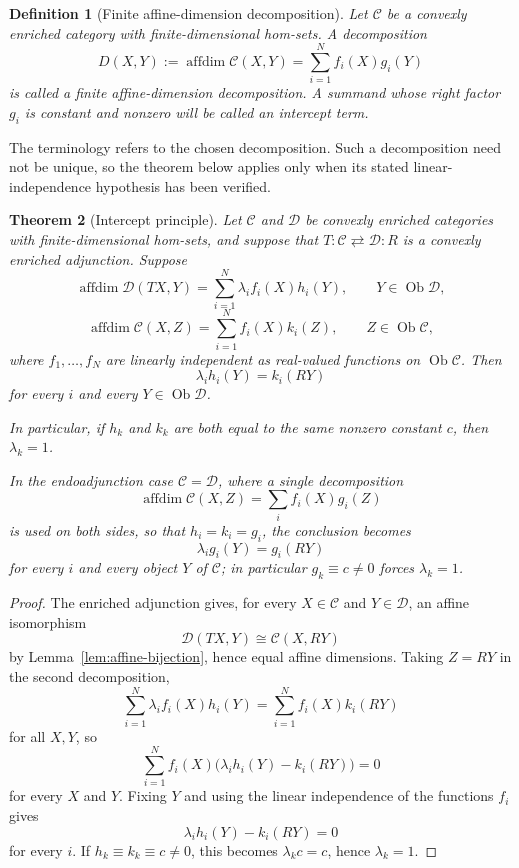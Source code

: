 \documentclass[11pt]{article}
\newtheorem{theorem}{Theorem}[section]
\newtheorem{definition}[theorem]{Definition}
\DeclareMathOperator{\affdim}{affdim}
\DeclareMathOperator{\Ob}{Ob}
\begin{document}
\begin{definition}[Finite affine-dimension decomposition]
Let $\mathcal C$ be a convexly enriched category with finite-dimensional
hom-sets. A decomposition
\[
D(X,Y):=\affdim\mathcal C(X,Y)
=
\sum_{i=1}^N f_i(X)g_i(Y)
\]
is called a \emph{finite affine-dimension decomposition}. A summand whose
right factor $g_i$ is constant and nonzero will be called an intercept term.
\end{definition}

The terminology refers to the chosen decomposition. Such a decomposition need
not be unique, so the theorem below applies only when its stated
linear-independence hypothesis has been verified.

\begin{theorem}[Intercept principle]
\label{thm:intercept}
Let $\mathcal C$ and $\mathcal D$ be convexly enriched categories with
finite-dimensional hom-sets, and suppose that
$T:\mathcal C\rightleftarrows\mathcal D:R$ is a convexly enriched
adjunction. Suppose
\[
\affdim\mathcal D(TX,Y)
=
\sum_{i=1}^N \lambda_i f_i(X)h_i(Y),
\qquad
Y\in\Ob\mathcal D,
\]
\[
\affdim\mathcal C(X,Z)
=
\sum_{i=1}^N f_i(X)k_i(Z),
\qquad
Z\in\Ob\mathcal C,
\]
where $f_1,\dots,f_N$ are linearly independent as real-valued functions on
$\Ob\mathcal C$. Then
\[
\lambda_i h_i(Y)=k_i(RY)
\]
for every $i$ and every $Y\in\Ob\mathcal D$.

In particular, if $h_k$ and $k_k$ are both equal to the same nonzero
constant $c$, then $\lambda_k=1$.

In the endoadjunction case $\mathcal C=\mathcal D$, where a single
decomposition
\[
\affdim\mathcal C(X,Z)=\sum_i f_i(X)g_i(Z)
\]
is used on both sides, so that $h_i=k_i=g_i$, the conclusion becomes
\[
\lambda_i g_i(Y)=g_i(RY)
\]
for every $i$ and every object $Y$ of $\mathcal C$; in particular
$g_k\equiv c\neq0$ forces $\lambda_k=1$.
\end{theorem}

\begin{proof}
The enriched adjunction gives, for every $X\in\mathcal C$ and
$Y\in\mathcal D$, an affine isomorphism
\[
\mathcal D(TX,Y)\cong\mathcal C(X,RY)
\]
by Lemma~\ref{lem:affine-bijection}, hence equal affine dimensions. Taking
$Z=RY$ in the second decomposition,
\[
\sum_{i=1}^N \lambda_i f_i(X)h_i(Y)
=
\sum_{i=1}^N f_i(X)k_i(RY)
\]
for all $X,Y$, so
\[
\sum_{i=1}^N f_i(X)\bigl(\lambda_i h_i(Y)-k_i(RY)\bigr)=0
\]
for every $X$ and $Y$. Fixing $Y$ and using the linear independence of the
functions $f_i$ gives
\[
\lambda_i h_i(Y)-k_i(RY)=0
\]
for every $i$. If $h_k\equiv k_k\equiv c\neq0$, this becomes
$\lambda_k c=c$, hence $\lambda_k=1$.
\end{proof}
\end{document}
